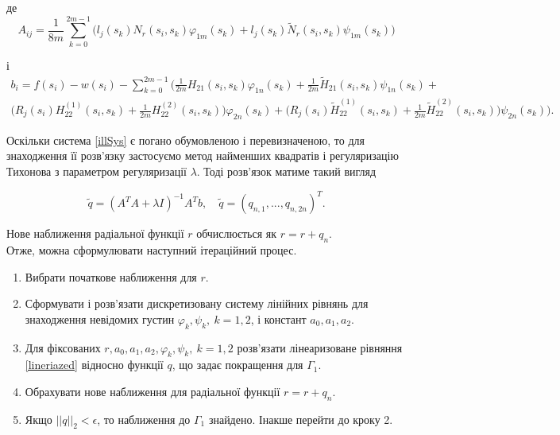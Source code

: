 \documentclass[12pt]{report}
\begin{document}
 де
 \begin{equation}
A_{ij}=\frac{1}{8m}\sum_{k=0}^{2m-1}\Big(l_{j}(s_k)N_r(s_i,s_k)\varphi_{1m}(s_k)+l_{j}(s_k)\tilde{N}_r(s_i,s_k)\psi_{1m}(s_k)\Big) \nonumber
 \end{equation} 
 
 і 
 \begin{equation}
 \begin{multlined}
 b_i=f(s_i)-w(s_i)-\sum_{k=0}^{2m-1}\Big(\frac{1}{2m}H_{21}(s_i,s_k)\varphi_{1n}(s_k)+\frac{1}{2m}\tilde{H}_{21}(s_i,s_k)\psi_{1n}(s_k)+\\\big(R_j(s_i)H_{22}^{(1)}(s_i,s_k)+\frac{1}{2m}H_{22}^{(2)}(s_i,s_k)\big)\varphi_{2n}(s_k)+\big(R_j(s_i)\tilde{H}_{22}^{(1)}(s_i,s_k)+\frac{1}{2m}\tilde{H}_{22}^{(2)}(s_i,s_k)\big)\psi_{2n}(s_k)\Big). \nonumber
 \end{multlined}
 \end{equation} 
 
 Оскільки система \eqref{illSys} є погано обумовленою і перевизначеною, то для знаходження її розв'язку застосуємо метод найменших квадратів і регуляризацію Тихонова з параметром регуляризації $\lambda$. Тоді розв'язок матиме такий вигляд
 
 \begin{equation}
\tilde{q}=(A^T A+\lambda I)^{-1}A^T b, \quad \tilde{q}=(q_{n,1}, ..., q_{n,2n})^T .
 \end{equation} 
 
 Нове наближення радіальної функції $r$ обчислюється як $r=r+q_n$.
 \\
 
 Отже, можна сформулювати наступний ітераційний процес.
\begin{enumerate}
  \item Вибрати початкове наближення для $r$.
  \item Сформувати і розв'язати дискретизовану систему лінійних рівнянь для знаходження невідомих густин $\varphi_k,\psi_k, \ k=1,2$, і констант $a_0,a_1, a_2$.
  \item Для фіксованих $r, a_0,a_1, a_2, \varphi_k,\psi_k, \ k=1,2$ розв'язати лінеаризоване рівняння \eqref{lineriazed} відносно функції $q$, що задає покращення для $\Gamma_1$.
  \item Обрахувати нове наближення для радіальної функції $r=r+q_n$.
  \item Якщо $||q||_2<\epsilon$, то наближення до $\Gamma_1$ знайдено. Інакше перейти до кроку 2.
\end{enumerate}
\end{document}
